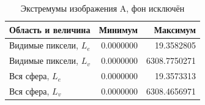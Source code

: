 \begin{table}[H]\centering\small
\caption{Экстремумы изображения A, фон исключён}
\begin{tabular}{@{}lrr@{}}\toprule Область и величина & Минимум & Максимум\\\midrule
Видимые пиксели, $L_e$ & 0.0000000 & 19.3582805 \\
Видимые пиксели, $L_v$ & 0.0000000 & 6308.7750271 \\
Вся сфера, $L_e$ & 0.0000000 & 19.3573313 \\
Вся сфера, $L_v$ & 0.0000000 & 6308.4656971 \\
\bottomrule\end{tabular}\end{table}